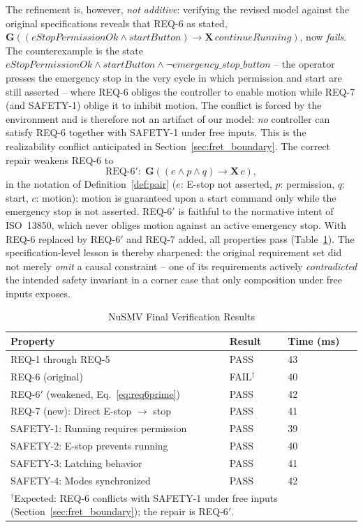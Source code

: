 \documentclass{ieeeaccess}
\theoremstyle{definition}
\newcommand{\G}{\mathbf{G}}
\newcommand{\X}{\mathbf{X}}
\begin{document}
The refinement is, however, \emph{not additive}: verifying the revised model against the original specifications reveals that REQ-6 as stated, $\G((\mathit{eStopPermissionOk} \wedge \mathit{startButton}) \rightarrow \X\,\mathit{continueRunning})$, now \emph{fails}. The counterexample is the state $\mathit{eStopPermissionOk} \wedge \mathit{startButton} \wedge \neg\mathit{emergency\_stop\_button}$ -- the operator presses the emergency stop in the very cycle in which permission and start are still asserted -- where REQ-6 obliges the controller to enable motion while REQ-7 (and SAFETY-1) oblige it to inhibit motion. The conflict is forced by the environment and is therefore not an artifact of our model: \emph{no} controller can satisfy REQ-6 together with SAFETY-1 under free inputs. This is the realizability conflict anticipated in Section~\ref{sec:fret_boundary}. The correct repair weakens REQ-6 to
\begin{equation}
\label{eq:req6prime}
\text{REQ-6}'\!:\; \G((e \wedge p \wedge q) \rightarrow \X\,c),
\end{equation}
in the notation of Definition~\ref{def:pair} ($e$: E-stop not asserted, $p$: permission, $q$: start, $c$: motion): motion is guaranteed upon a start command only while the emergency stop is not asserted. REQ-6$'$ is faithful to the normative intent of ISO~13850, which never obliges motion against an active emergency stop. With REQ-6 replaced by REQ-6$'$ and REQ-7 added, all properties pass (Table~\ref{tab:FinalVerificationResultsNuSMV}). The specification-level lesson is thereby sharpened: the original requirement set did not merely \emph{omit} a causal constraint -- one of its requirements actively \emph{contradicted} the intended safety invariant in a corner case that only composition under free inputs exposes.

\begin{table}[t]
\centering
\caption{NuSMV Final Verification Results}
\label{tab:FinalVerificationResultsNuSMV}
\small
\begin{tabular}{lll}
\toprule
\textbf{Property} & \textbf{Result} & \textbf{Time (ms)}\\
\midrule
REQ-1 through REQ-5 & PASS & 43 \\
REQ-6 (original) & FAIL$^{\dagger}$ & 40 \\
REQ-6$'$ (weakened, Eq.~\eqref{eq:req6prime}) & PASS & 42 \\
REQ-7 (new): Direct E-stop $\rightarrow$ stop & PASS & 41 \\
SAFETY-1: Running requires permission & PASS & 39 \\
SAFETY-2: E-stop prevents running & PASS & 40 \\
SAFETY-3: Latching behavior & PASS & 41 \\
SAFETY-4: Modes synchronized & PASS & 42 \\
\bottomrule
\multicolumn{3}{p{0.9\columnwidth}}{$^{\dagger}$Expected: REQ-6 conflicts with SAFETY-1 under free inputs (Section~\ref{sec:fret_boundary}); the repair is REQ-6$'$.} \\
\end{tabular}
\end{table}
\end{document}
